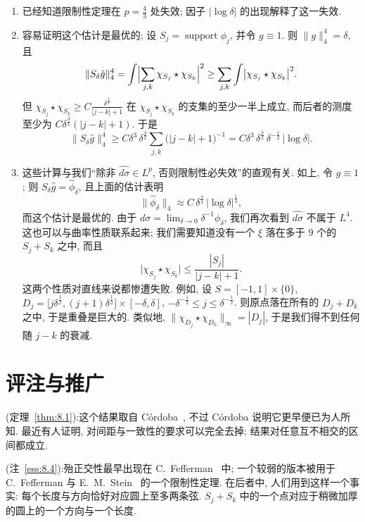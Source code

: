 \begin{remark}\label{rem:8.12}
\begin{enumerate}[label=\alph*)]
\item 已经知道限制性定理在 $p=\frac{4}{3}$ 处失效; 因子 $|\log\delta|$ 的出现解释了这一失效.
\item 容易证明这个估计是最优的; 设 $S_j=\operatorname{support}\phi_j$, 并令 $g\equiv 1$. 则 $\|g\|_4^4=\delta$, 且
\[
\|S_{\delta}\hat{g}\|_{4}^{4}=\int\Bigl|\sum_{j,k}\chi_{S_{j}}\star\chi_{S_{k}}\Bigr|^{2}
\geq\sum_{j,k}\int\bigl|\chi_{S_{j}}\star\chi_{S_{k}}\bigr|^{2}.
\]
但 $\chi_{S_{j}}\star\chi_{S_{k}}\geq C\frac{\delta^{\frac{3}{2}}}{|j-k|+1}$ 在 $\chi_{S_{j}}\star\chi_{S_{k}}$ 的支集的至少一半上成立, 而后者的测度至少为 $C\delta^{\frac{3}{2}}(|j-k|+1)$. 于是
\[
\|S_{\delta}\hat{g}\|_{4}^{4}
\geq C\delta^{3}\,\delta^{\frac{3}{2}}\sum_{j,k}\bigl(|j-k|+1\bigr)^{-1}
=C\delta^{3}\,\delta^{\frac{3}{2}}\,\delta^{-\frac{1}{2}}\,|\log\delta|.
\]
\item 这些计算与我们``除非 $\widehat{d\sigma}\in L^p$, 否则限制性必失效''的直观有关. 如上, 令 $\hat{g}\equiv 1$; 则 $S_{\delta}\hat{g}=\hat{\phi}_{\delta}$, 且上面的估计表明
\[
\|\hat{\phi}_{\delta}\|_{4}\approx C\,\delta^{\frac{3}{4}}\,|\log\delta|^{\frac{1}{4}},
\]
而这个估计是最优的. 由于 $d\sigma=\lim_{\delta\to0}\delta^{-1}\phi_{\delta}$, 我们再次看到 $\widehat{d\sigma}$ 不属于 $L^4$. 这也可以与曲率性质联系起来; 我们需要知道没有一个 $\xi$ 落在多于 $9$ 个的 $S_j+S_k$ 之中, 而且
\[
\bigl|\chi_{S_{j}}\star\chi_{S_{k}}\bigr|\leq\frac{|S_{j}|}{|j-k|+1}.
\]
这两个性质对直线来说都惨遭失败. 例如, 设 $S=[-1,1]\times\{0\}$, $D_j=\bigl[j\delta^{\frac{1}{2}},(j+1)\delta^{\frac{1}{2}}\bigr]\times[-\delta,\delta]$, $-\delta^{-\frac{1}{2}}\leq j\leq\delta^{-\frac{1}{2}}$. 则原点落在所有的 $D_j+D_k$ 之中, 于是重叠是巨大的. 类似地, $\|\chi_{D_j}\star\chi_{D_k}\|_{\infty}=|D_j|$, 于是我们得不到任何随 $j-k$ 的衰减.
\end{enumerate}
\end{remark}

\section{评注与推广}
\label{sec:8.5}

\noindent (定理~\ref{thm:8.1}):\quad 这个结果取自 C\'ordoba~\cite{cordoba-kakeya}, 不过 C\'ordoba 说明它更早便已为人所知. 最近有人证明, 对间距与一致性的要求可以完全去掉; 结果对任意互不相交的区间都成立.

\noindent (注~\ref*{ess:8.4}):\quad 殆正交性最早出现在 C.~Fefferman~\cite{fefferman-spherical} 中; 一个较弱的版本被用于 C.~Fefferman 与 E.~M.~Stein~\cite{fefferman-stronglysingular} 的一个限制性定理. 在后者中, 人们用到这样一个事实: 每个长度与方向恰好对应圆上至多两条弦. $S_{j}+S_{k}$ 中的一个点对应于稍微加厚的圆上的一个方向与一个长度.

